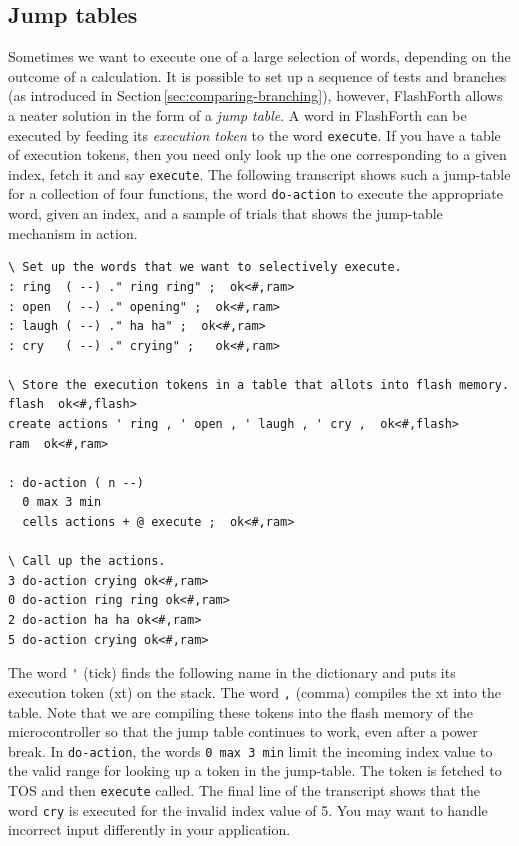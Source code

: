 \documentclass[12pt,a4paper]{article}
\begin{document}
\subsection{Jump tables}
\label{sec:jump-tables}
%
Sometimes we want to execute one of a large selection of words, 
depending on the outcome of a calculation.
It is possible to set up a sequence of tests and branches 
(as introduced in Section\,\ref{sec:comparing-branching}), 
however, FlashForth allows a neater
solution in the form of a \textit{jump table}.
A word in FlashForth can be executed by feeding its \textit{execution token}
to the word \verb!execute!.
If you have a table of execution tokens, then you need only look up the 
one corresponding to a given index, fetch it and say \verb!execute!.
The following transcript shows such a jump-table for a collection of four functions,
the word \verb!do-action! to execute the appropriate word, given an index,
and a sample of trials that shows the jump-table mechanism in action.
\begin{verbatim}
\ Set up the words that we want to selectively execute.
: ring  ( --) ." ring ring" ;  ok<#,ram>
: open  ( --) ." opening" ;  ok<#,ram>
: laugh ( --) ." ha ha" ;  ok<#,ram>
: cry   ( --) ." crying" ;   ok<#,ram>

\ Store the execution tokens in a table that allots into flash memory.
flash  ok<#,flash>
create actions ' ring , ' open , ' laugh , ' cry ,  ok<#,flash>
ram  ok<#,ram>

: do-action ( n --) 
  0 max 3 min 
  cells actions + @ execute ;  ok<#,ram>

\ Call up the actions.
3 do-action crying ok<#,ram>
0 do-action ring ring ok<#,ram>
2 do-action ha ha ok<#,ram>
5 do-action crying ok<#,ram>
\end{verbatim}
The word \verb!'! (tick) finds the following name in the dictionary and
puts its execution token (xt) on the stack.  
The word \verb!,! (comma) compiles the xt into the table.
Note that we are compiling these tokens into the flash memory of the microcontroller
so that the jump table continues to work, even after a power break.
In \verb!do-action!, the words \verb!0 max 3 min! limit the incoming index value to 
the valid range for looking up a token in the jump-table.
The token is fetched to TOS and then \verb!execute! called.
The final line of the transcript shows that the word \verb!cry! is executed for
the invalid index value of 5.
You may want to handle incorrect input differently in your application.
\end{document}
